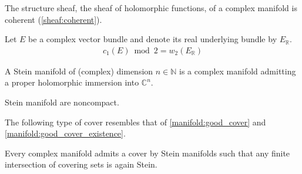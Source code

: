     \begin{theorem}
        The structure sheaf, the sheaf of holomorphic functions, of a complex manifold is coherent (\cref{sheaf:coherent}).
    \end{theorem}

    \begin{property}\label{complex:stiefel_whitney}
        Let $E$ be a complex vector bundle and denote its real underlying bundle by $E_{\mathbb{R}}$.
        \begin{gather}
            c_1(E)\bmod2 = w_2(E_{\mathbb{R}})
        \end{gather}
    \end{property}

    \begin{adefinition}
        A Stein manifold of (complex) dimension $n\in\mathbb{N}$ is a complex manifold admitting a proper holomorphic immersion into $\mathbb{C}^n$.
    \end{adefinition}

    \begin{property}
        Stein manifold are noncompact.
    \end{property}

    The following type of cover resembles that of \cref{manifold:good_cover} and \cref{manifold:good_cover_existence}.
    \begin{property}
        Every complex manifold admits a cover by Stein manifolds such that any finite intersection of covering sets is again Stein.
    \end{property}

